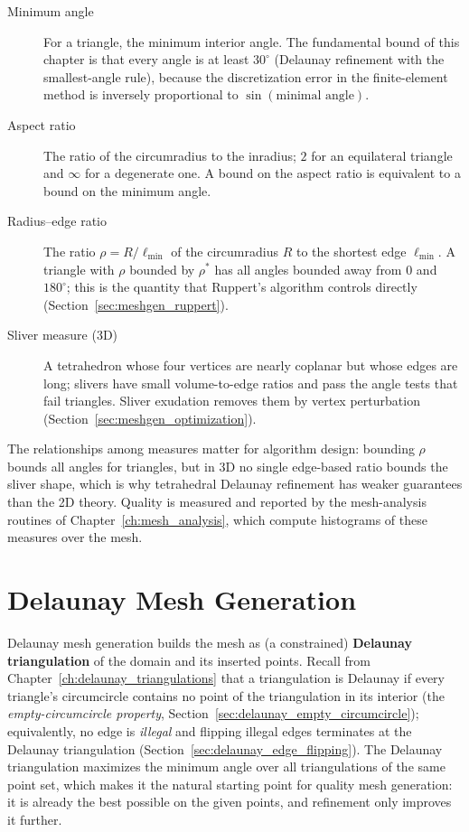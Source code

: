 \begin{description}
  \item[Minimum angle] For a triangle, the minimum interior angle. The
    fundamental bound of this chapter is that every angle is at least
    $30^\circ$ (Delaunay refinement with the smallest-angle rule), because
    the discretization error in the finite-element method is inversely
    proportional to $\sin(\text{minimal angle})$.
  \item[Aspect ratio] The ratio of the circumradius to the inradius; $2$
    for an equilateral triangle and $\infty$ for a degenerate one. A bound
    on the aspect ratio is equivalent to a bound on the minimum angle.
  \item[Radius--edge ratio] The ratio $\rho = R / \ell_{\min}$ of the
    circumradius $R$ to the shortest edge $\ell_{\min}$. A triangle with
    $\rho$ bounded by $\rho^*$ has all angles bounded away from $0$ and
    $180^\circ$; this is the quantity that Ruppert's algorithm controls
    directly (Section~\ref{sec:meshgen_ruppert}).
  \item[Sliver measure (3D)] A tetrahedron whose four vertices are nearly
    coplanar but whose edges are long; slivers have small volume-to-edge
    ratios and pass the angle tests that fail triangles. Sliver exudation
    removes them by vertex perturbation (Section~\ref{sec:meshgen_optimization}).
\end{description}

The relationships among measures matter for algorithm design: bounding
$\rho$ bounds all angles for triangles, but in 3D no single edge-based
ratio bounds the sliver shape, which is why tetrahedral Delaunay refinement
has weaker guarantees than the 2D theory. Quality is measured and reported
by the mesh-analysis routines of Chapter~\ref{ch:mesh_analysis}, which
compute histograms of these measures over the mesh.


\section{Delaunay Mesh Generation}
\label{sec:meshgen_delaunay}

Delaunay mesh generation builds the mesh as (a constrained)
\textbf{Delaunay triangulation} of the domain
and its inserted points. Recall from Chapter~\ref{ch:delaunay_triangulations}
that a triangulation is Delaunay if every triangle's circumcircle contains
no point of the triangulation in its interior (the \emph{empty-circumcircle
property}, Section~\ref{sec:delaunay_empty_circumcircle}); equivalently, no
edge is \emph{illegal} and flipping illegal edges terminates at the Delaunay
triangulation (Section~\ref{sec:delaunay_edge_flipping}). The Delaunay
triangulation maximizes the minimum angle over all triangulations of the
same point set, which makes it the natural starting point for quality mesh
generation: it is already the best possible on the given points, and
refinement only improves it further.

